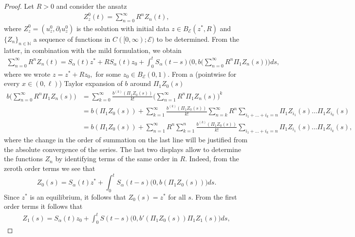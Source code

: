 \documentclass[10pt, reqno]{amsart}
\newcommand{\N}{\mathbb{N}}
\newcommand{\e}{\mathcal{E}}
\theoremstyle{definition}
\numberwithin{lem}{section}
\numberwithin{cor}{section}
\numberwithin{prop}{section}
\numberwithin{thm}{section}
\numberwithin{dfn}{section}
\begin{document}
\begin{proof} Let $R>0$ and consider the ansatz
\begin{equation}\label{eq:ansatz}
    \begin{aligned}
     Z^0_z(t)=\sum_{n=0}^{\infty}R^nZ_n(t),
     \end{aligned}
\end{equation}
where $Z^0_z=(u^0_z,\partial_tu^0_z)$ is the solution with initial data $z\in B_\e(z^*,R)$ and $\{Z_n\}_{n\in\N}$ a sequence of functions in $C([0,\infty);\e)$ to be determined. From the latter, in combination with the mild formulation, we obtain
\begin{equation*}
    \begin{aligned}    \sum_{n=0}^{\infty}R^nZ_n(t)=S_\alpha(t)z^*+RS_\alpha(t)z_0+\int_{0}^{t}S_\alpha(t-s)\bigg(0, b\bigg(\sum_{n=0}^{\infty}R^n\Pi_1Z_n(s)\bigg)\bigg)ds,
     \end{aligned}
\end{equation*}
where we wrote $z=z^*+Rz_0,$ for some $z_0\in B_\e(0,1).$ From a (pointwise for every $x\in(0,\ell)$) Taylor expansion of $b$ around $\Pi_1Z_0(s)$ 
\begin{equation*}
    \begin{aligned}        b\bigg(\sum_{n=0}^{\infty}R^n\Pi_1Z_n(s)\bigg)&=\sum_{k=0}^{\infty}\frac{b^{(k)}(\Pi_1Z_0(s))}{k!}\bigg(\sum_{n=1}^{\infty}R^n\Pi_1Z_n(s)\bigg)^k\\&
    =b(\Pi_1Z_0(s))+\sum_{k=1}^{\infty}\frac{b^{(k)}(\Pi_1Z_0(s))}{k!}\sum_{n=k}^{\infty}R^n\sum_{i_1+\dots+i_k=n}\Pi_1Z_{i_1}(s)\dots \Pi_1Z_{i_k}(s)\\&    =b(\Pi_1Z_0(s))+\sum_{n=1}^{\infty}R^n\sum_{k=1}^{n}\frac{b^{(k)}(\Pi_1Z_0(s))}{k!}\sum_{i_1+\dots+i_k=n}\Pi_1Z_{i_1}(s)\dots \Pi_1Z_{i_k}(s),
    \end{aligned}
\end{equation*}
where the change in the order of summation on the last line will be justified from the absolute convergence of the series.
The last two displays allow to determine the functions $Z_n$ by identifying terms of the same order in $R.$ Indeed, from the zeroth order terms we see that 
$$Z_0(s)=S_\alpha(t)z^*+\int_0^tS_\alpha(t-s)\bigg(0, b(\Pi_1Z_0(s))\bigg)ds.    $$
Since $z^*$ is an equilibrium, it follows that $Z_0(s)=z^*$ for all $s.$ From the first order terms it follows that 
\begin{equation*}\label{eq:n=1}
    \begin{aligned}
        Z_1(s)=S_\alpha(t)z_0+\int_{0}^{t}S(t-s)\bigg(0, b'(\Pi_1Z_0(s))\Pi_1Z_1(s)\bigg)ds,

\end{aligned}
\end{equation*}
\end{proof}
\end{document}
